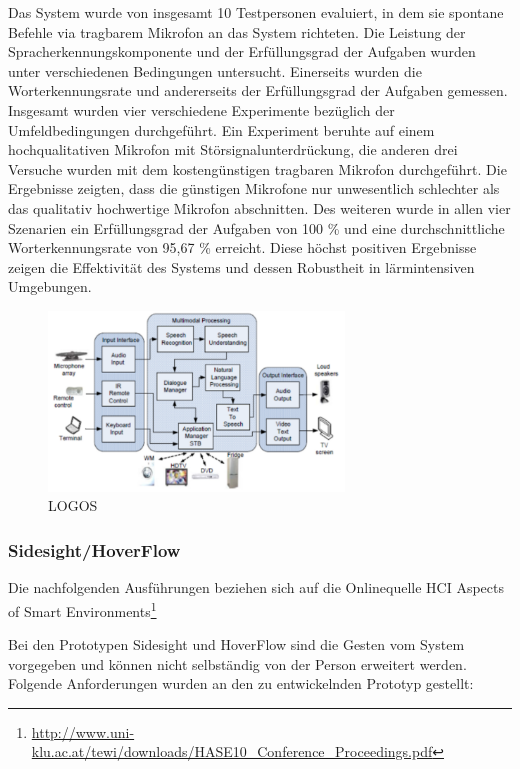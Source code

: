 Das System wurde von insgesamt 10 Testpersonen evaluiert, in dem sie spontane Befehle via tragbarem Mikrofon an das System richteten. Die Leistung der Spracherkennungskomponente und der Erfüllungsgrad der Aufgaben wurden unter verschiedenen Bedingungen untersucht. Einerseits wurden die Worterkennungsrate und andererseits der Erfüllungsgrad der Aufgaben gemessen. Insgesamt wurden vier verschiedene Experimente bezüglich der Umfeldbedingungen durchgeführt. Ein Experiment beruhte auf einem hochqualitativen Mikrofon mit Störsignalunterdrückung, die anderen drei Versuche wurden mit dem kostengünstigen tragbaren Mikrofon durchgeführt. Die Ergebnisse zeigten, dass die günstigen Mikrofone nur unwesentlich schlechter als das qualitativ hochwertige Mikrofon abschnitten. Des weiteren wurde in allen vier Szenarien ein Erfüllungsgrad der Aufgaben von 100 \% und eine durchschnittliche Worterkennungsrate von 95,67 \% erreicht. Diese höchst positiven Ergebnisse zeigen die Effektivität des Systems und dessen Robustheit in lärmintensiven Umgebungen.

\begin{figure}[h!]
	\centering
	\includegraphics[width=0.7\textwidth]{img/Feedback-Mechanismen/LOGOS.png}
	\caption{LOGOS}
	\label{fig:feedbackLOGOS}
\end{figure}

\subsubsection{Sidesight/HoverFlow}

Die nachfolgenden Ausführungen beziehen sich auf die Onlinequelle \glqq HCI Aspects of Smart Environments\grqq\footnote{\url{http://www.uni-klu.ac.at/tewi/downloads/HASE10_Conference_Proceedings.pdf}}

Bei den Prototypen Sidesight und HoverFlow sind die Gesten vom System vorgegeben und können
nicht selbständig von der Person erweitert werden. Folgende Anforderungen wurden an den zu
entwickelnden Prototyp gestellt:

